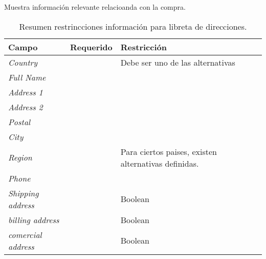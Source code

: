 \section{\shippingEF}\label{chapter:solucionimplementada:section:orders}

Muestra información relevante relacioanda con la compra.



\begin{table}[H]
    \centering
	\begin{tabular}{ |l|c||l| }
		\hline Campo & Requerido & Restricción \\ \hline
		\multirow{1}{*}{\textit{Country}} 			&  \checkmark 	&  Debe ser uno de las alternativas\\ \hline
		\multirow{1}{*}{\textit{Full Name}} 		&  \checkmark	& \\ \hline
		\multirow{1}{*}{\textit{Address 1}} 		&  \checkmark	& \\ \hline
		\multirow{1}{*}{\textit{Address 2}} 		&  				& \\ \hline
		\multirow{1}{*}{\textit{Postal}} 			&  \checkmark	& \\ \hline
		\multirow{1}{*}{\textit{City}} 				&  \checkmark	& \\ \hline
		\multirow{1}{*}{\textit{Region}} 			&  \checkmark	& Para ciertos paises, existen alternativas definidas.\\ \hline
		\multirow{1}{*}{\textit{Phone}} 			&  \checkmark	& \\ \hline
		\multirow{1}{*}{\textit{Shipping address}} 	&  \checkmark	& Boolean \\ \hline
		\multirow{1}{*}{\textit{billing address}} 	&  \checkmark	& Boolean \\ \hline
		\multirow{1}{*}{\textit{comercial address}} &  \checkmark	& Boolean \\ \hline
	\end{tabular}
 	\caption{Resumen restrincciones información para libreta de direcciones.}
    \label{tab:order:view:status}
\end{table}
